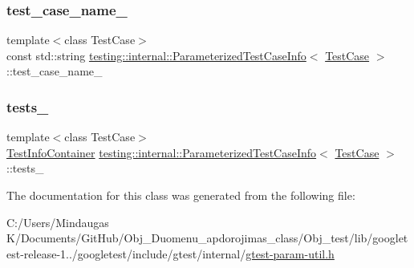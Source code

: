 \mbox{\label{classtesting_1_1internal_1_1_parameterized_test_case_info_a29b78b287552ba36a896e9352e86440c}} 
\subsubsection{\texorpdfstring{test\_case\_name\_}{test\_case\_name\_}}
{\footnotesize\ttfamily template$<$class Test\+Case$>$ \\
const std\+::string \mbox{\hyperlink{classtesting_1_1internal_1_1_parameterized_test_case_info}{testing\+::internal\+::\+Parameterized\+Test\+Case\+Info}}$<$ \mbox{\hyperlink{classtesting_1_1_test_case}{Test\+Case}} $>$\+::test\+\_\+case\+\_\+name\+\_\+\hspace{0.3cm}{\ttfamily [private]}}

\mbox{\label{classtesting_1_1internal_1_1_parameterized_test_case_info_a561fad516239cf6427df6915ba3182e9}} 
\subsubsection{\texorpdfstring{tests\_}{tests\_}}
{\footnotesize\ttfamily template$<$class Test\+Case$>$ \\
\mbox{\hyperlink{classtesting_1_1internal_1_1_parameterized_test_case_info_aeabb0c5fa88a11a0b9037167a57d6922}{Test\+Info\+Container}} \mbox{\hyperlink{classtesting_1_1internal_1_1_parameterized_test_case_info}{testing\+::internal\+::\+Parameterized\+Test\+Case\+Info}}$<$ \mbox{\hyperlink{classtesting_1_1_test_case}{Test\+Case}} $>$\+::tests\+\_\+\hspace{0.3cm}{\ttfamily [private]}}



The documentation for this class was generated from the following file\+:\begin{DoxyCompactItemize}
\item 
C\+:/\+Users/\+Mindaugas K/\+Documents/\+Git\+Hub/\+Obj\+\_\+\+Duomenu\+\_\+apdorojimas\+\_\+class/\+Obj\+\_\+test/lib/googletest-\/release-\/1../googletest/include/gtest/internal/\mbox{\hyperlink{_obj__test_2lib_2googletest-release-1_88_81_2googletest_2include_2gtest_2internal_2gtest-param-util_8h}{gtest-\/param-\/util.\+h}}\end{DoxyCompactItemize}
